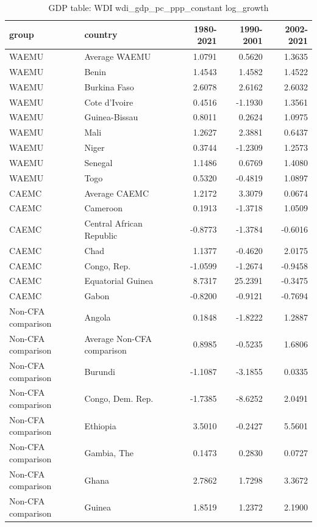 \begin{table}

\caption{GDP table: WDI wdi_gdp_pc_ppp_constant log_growth}
\centering
\begin{tabular}[t]{llrrr}
\toprule
group & country & 1980-2021 & 1990-2001 & 2002-2021\\
\midrule
WAEMU & Average WAEMU & 1.0791 & 0.5620 & 1.3635\\
WAEMU & Benin & 1.4543 & 1.4582 & 1.4522\\
WAEMU & Burkina Faso & 2.6078 & 2.6162 & 2.6032\\
WAEMU & Cote d'Ivoire & 0.4516 & -1.1930 & 1.3561\\
WAEMU & Guinea-Bissau & 0.8011 & 0.2624 & 1.0975\\
\addlinespace
WAEMU & Mali & 1.2627 & 2.3881 & 0.6437\\
WAEMU & Niger & 0.3744 & -1.2309 & 1.2573\\
WAEMU & Senegal & 1.1486 & 0.6769 & 1.4080\\
WAEMU & Togo & 0.5320 & -0.4819 & 1.0897\\
CAEMC & Average CAEMC & 1.2172 & 3.3079 & 0.0674\\
\addlinespace
CAEMC & Cameroon & 0.1913 & -1.3718 & 1.0509\\
CAEMC & Central African Republic & -0.8773 & -1.3784 & -0.6016\\
CAEMC & Chad & 1.1377 & -0.4620 & 2.0175\\
CAEMC & Congo, Rep. & -1.0599 & -1.2674 & -0.9458\\
CAEMC & Equatorial Guinea & 8.7317 & 25.2391 & -0.3475\\
\addlinespace
CAEMC & Gabon & -0.8200 & -0.9121 & -0.7694\\
Non-CFA comparison & Angola & 0.1848 & -1.8222 & 1.2887\\
Non-CFA comparison & Average Non-CFA comparison & 0.8985 & -0.5235 & 1.6806\\
Non-CFA comparison & Burundi & -1.1087 & -3.1855 & 0.0335\\
Non-CFA comparison & Congo, Dem. Rep. & -1.7385 & -8.6252 & 2.0491\\
\addlinespace
Non-CFA comparison & Ethiopia & 3.5010 & -0.2427 & 5.5601\\
Non-CFA comparison & Gambia, The & 0.1473 & 0.2830 & 0.0727\\
Non-CFA comparison & Ghana & 2.7862 & 1.7298 & 3.3672\\
Non-CFA comparison & Guinea & 1.8519 & 1.2372 & 2.1900\\

\end{tabular}
\end{table}
